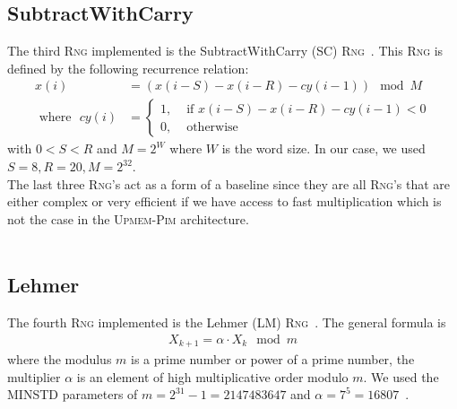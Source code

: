 \documentclass[a4paper]{scrartcl}
\begin{document}
\subsection{SubtractWithCarry} \label{sec:2.3}
The third \textsc{Rng} implemented is the SubtractWithCarry (SC) \textsc{Rng}~\cite*{SC}.
This \textsc{Rng} is defined by the following recurrence relation:
\begin{align*}
    x(i) &= (x(i - S) - x(i - R) - cy(i - 1)) \mod M \\
    \text{ where }\,\, cy(i) &= \left\{\begin{array}{cl}
        1, & \text{ if $x(i - S) - x(i - R) - cy(i - 1) < 0$} \\
        0, & \text{ otherwise }
    \end{array}\right.
\end{align*}
with $0 < S < R$ and $M = 2^W$ where $W$ is the word size.
In our case, we used $S = 8, R = 20, M = 2^{32}$.
\vspace*{\fill}
\\
The last three \textsc{Rng}'s act as a form of a baseline since they are all \textsc{Rng}'s that are either complex or very efficient if we have access to fast multiplication which is not the case in the \textsc{Upmem-Pim} architecture.
\\ \\ 

\newpage
\subsection{Lehmer} \label{sec:2.4}
The fourth \textsc{Rng} implemented is the Lehmer (LM) \textsc{Rng}~\cite*{LM}.
The general formula is 
\begin{align*}
    X_{k + 1} = \alpha \cdot X_k \mod m
\end{align*}
where the modulus $m$ is a prime number or power of a prime number, the multiplier $\alpha$ is an element of high multiplicative order modulo $m$.
We used the MINSTD parameters of $m = 2^{31} - 1 = 2147483647$ and $\alpha = 7^5 = 16807$~\cite*{MINSTD}.
\end{document}
